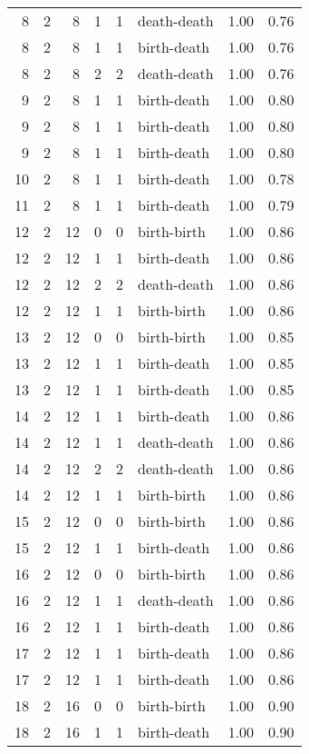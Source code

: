 \documentclass{article}
\begin{document}
\begin{center}
\begin{tabular}{rrrrrlrr}
8 & 2 & 8 & 1 & 1 & death-death & 1.00 & 0.76 \\
8 & 2 & 8 & 1 & 1 & birth-death & 1.00 & 0.76 \\
8 & 2 & 8 & 2 & 2 & death-death & 1.00 & 0.76 \\
9 & 2 & 8 & 1 & 1 & birth-death & 1.00 & 0.80 \\
9 & 2 & 8 & 1 & 1 & birth-death & 1.00 & 0.80 \\
9 & 2 & 8 & 1 & 1 & birth-death & 1.00 & 0.80 \\
10 & 2 & 8 & 1 & 1 & birth-death & 1.00 & 0.78 \\
11 & 2 & 8 & 1 & 1 & birth-death & 1.00 & 0.79 \\
12 & 2 & 12 & 0 & 0 & birth-birth & 1.00 & 0.86 \\
12 & 2 & 12 & 1 & 1 & birth-death & 1.00 & 0.86 \\
12 & 2 & 12 & 2 & 2 & death-death & 1.00 & 0.86 \\
12 & 2 & 12 & 1 & 1 & birth-birth & 1.00 & 0.86 \\
13 & 2 & 12 & 0 & 0 & birth-birth & 1.00 & 0.85 \\
13 & 2 & 12 & 1 & 1 & birth-death & 1.00 & 0.85 \\
13 & 2 & 12 & 1 & 1 & birth-death & 1.00 & 0.85 \\
14 & 2 & 12 & 1 & 1 & birth-death & 1.00 & 0.86 \\
14 & 2 & 12 & 1 & 1 & death-death & 1.00 & 0.86 \\
14 & 2 & 12 & 2 & 2 & death-death & 1.00 & 0.86 \\
14 & 2 & 12 & 1 & 1 & birth-birth & 1.00 & 0.86 \\
15 & 2 & 12 & 0 & 0 & birth-birth & 1.00 & 0.86 \\
15 & 2 & 12 & 1 & 1 & birth-death & 1.00 & 0.86 \\
16 & 2 & 12 & 0 & 0 & birth-birth & 1.00 & 0.86 \\
16 & 2 & 12 & 1 & 1 & death-death & 1.00 & 0.86 \\
16 & 2 & 12 & 1 & 1 & birth-death & 1.00 & 0.86 \\
17 & 2 & 12 & 1 & 1 & birth-death & 1.00 & 0.86 \\
17 & 2 & 12 & 1 & 1 & birth-death & 1.00 & 0.86 \\
18 & 2 & 16 & 0 & 0 & birth-birth & 1.00 & 0.90 \\
18 & 2 & 16 & 1 & 1 & birth-death & 1.00 & 0.90 \\
\bottomrule
\end{tabular}


\end{center}
\end{document}
